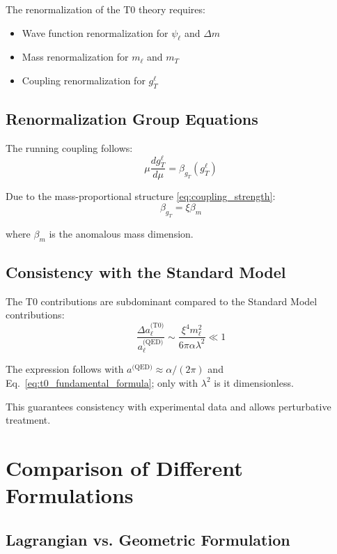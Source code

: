	The renormalization of the T0 theory requires:
	\begin{itemize}
		\item Wave function renormalization for $\psi_\ell$ and $\Delta m$
		\item Mass renormalization for $m_\ell$ and $m_T$
		\item Coupling renormalization for $g_T^\ell$
	\end{itemize}
	
	\subsection{Renormalization Group Equations}
	
	The running coupling follows:
	\begin{equation}
		\mu \frac{d g_T^\ell}{d\mu} = \beta_{g_T}(g_T^\ell)
		\label{eq:rg_equation}
	\end{equation}
	
	Due to the mass-proportional structure \eqref{eq:coupling_strength}:
	\begin{equation}
		\beta_{g_T} = \xi \beta_m
		\label{eq:beta_relation}
	\end{equation}
	
	where $\beta_m$ is the anomalous mass dimension.
	
	\subsection{Consistency with the Standard Model}
	
	The T0 contributions are subdominant compared to the Standard Model contributions:
	\begin{equation}
		\frac{\Delta a_\ell^{\text{(T0)}}}{a_\ell^{\text{(QED)}}} \sim \frac{\xi^4 m_\ell^2}{6\pi\alpha\lambda^2} \ll 1
		\label{eq:hierarchy}
	\end{equation}
	
	The expression follows with $a^\text{(QED)} \approx \alpha/(2\pi)$ and Eq.~\eqref{eq:t0_fundamental_formula}; only with $\lambda^2$ is it dimensionless.

	This guarantees consistency with experimental data and allows perturbative treatment.
	
	\section{Comparison of Different Formulations}
	
	\subsection{Lagrangian vs. Geometric Formulation}
	
